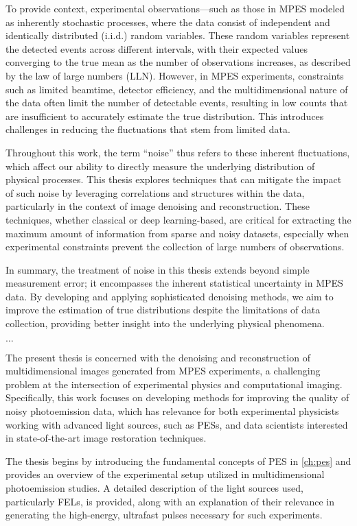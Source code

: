 To provide context, experimental observations—such as those in \gls{MPES} modeled as inherently stochastic processes, where the data consist of independent and identically distributed (i.i.d.) random variables. These random variables represent the detected events across different intervals, with their expected values converging to the true mean as the number of observations increases, as described by the law of large numbers (LLN). However, in \gls{MPES} experiments, constraints such as limited beamtime, detector efficiency, and the multidimensional nature of the data often limit the number of detectable events, resulting in low counts that are insufficient to accurately estimate the true distribution. This introduces challenges in reducing the fluctuations that stem from limited data.

Throughout this work, the term “noise” thus refers to these inherent fluctuations, which affect our ability to directly measure the underlying distribution of physical processes. This thesis explores techniques that can mitigate the impact of such noise by leveraging correlations and structures within the data, particularly in the context of image denoising and reconstruction. These techniques, whether classical or deep learning-based, are critical for extracting the maximum amount of information from sparse and noisy datasets, especially when experimental constraints prevent the collection of large numbers of observations.

In summary, the treatment of noise in this thesis extends beyond simple measurement error; it encompasses the inherent statistical uncertainty in \gls{MPES} data. By developing and applying sophisticated denoising methods, we aim to improve the estimation of true distributions despite the limitations of data collection, providing better insight into the underlying physical phenomena.

$\dots$

The present thesis is concerned with the denoising and reconstruction of multidimensional images generated from \gls{MPES} experiments, a challenging problem at the intersection of experimental physics and computational imaging. Specifically, this work focuses on developing methods for improving the quality of noisy photoemission data, which has relevance for both experimental physicists working with advanced light sources, such as \glspl{PES}, and data scientists interested in state-of-the-art image restoration techniques.

The thesis begins by introducing the fundamental concepts of \gls{PES} in \cref{ch:pes} and provides an overview of the experimental setup utilized in multidimensional photoemission studies. A detailed description of the light sources used, particularly FELs, is provided, along with an explanation of their relevance in generating the high-energy, ultrafast pulses necessary for such experiments.

